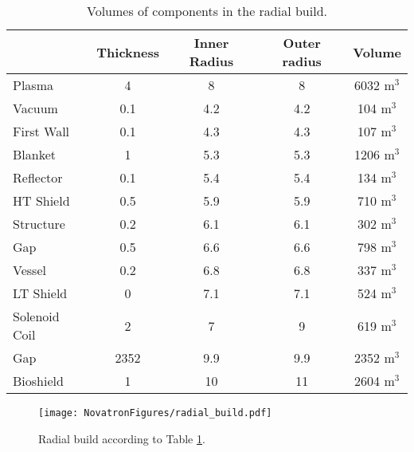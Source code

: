 \begin{table}[h!]
    \centering
    \begin{tabular}{l c  c c c}
    \hline
        &	Thickness	&	Inner Radius	&	Outer radius	&	Volume		\\
        \hline
Plasma	&	4	&	8	&	8	&	6032	m$^{3}$	\\
Vacuum	&	0.1	&	4.2	&	4.2	&	104	m$^{3}$	\\
First Wall	&	0.1	&	4.3	&	4.3	&	107	m$^{3}$	\\
Blanket	&	1	&	5.3	&	5.3	&	1206	m$^{3}$	\\
Reflector	&	0.1	&	5.4	&	5.4	&	134	m$^{3}$	\\
HT Shield	&	0.5	&	5.9	&	5.9	&	710	m$^{3}$	\\
Structure	&	0.2	&	6.1	&	6.1	&	302	m$^{3}$	\\
Gap	&	0.5	&	6.6	&	6.6	&	798	m$^{3}$	\\
Vessel	&	0.2	&	6.8	&	6.8	&	337	m$^{3}$	\\
LT Shield	&	0	&	7.1	&	7.1	&	524	m$^{3}$	\\
Solenoid Coil&	2	&	7	&	9	&	619	m$^{3}$	\\
Gap	&	2352	&	9.9	&	9.9	&	2352	m$^{3}$	\\
Bioshield	&	1	&	10	&	11	&	2604	m$^{3}$	\\

        \hline
    \end{tabular}
    \caption{Volumes of components in the radial build.}
    \label{tab:volumes}
\end{table}

\begin{figure}
    \centering
    \texttt{[image: NovatronFigures/radial\_build.pdf]}
    \caption{Radial build according to Table \ref{tab:volumes}.}
    \label{fig:radial}
\end{figure}





